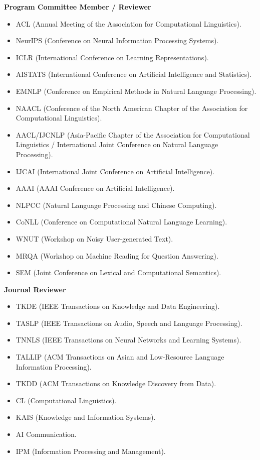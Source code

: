 \noindent \textbf{Program Committee Member / Reviewer}
\begin{itemize}[label={},leftmargin=15pt]
\item ACL (Annual Meeting of the Association for Computational Linguistics).
\item NeurIPS (Conference on Neural Information Processing Systems).
\item ICLR (International Conference on Learning Representations).
\item AISTATS (International Conference on Artificial Intelligence and Statistics).
\item EMNLP (Conference on Empirical Methods in Natural Language Processing).
\item NAACL (Conference of the North American Chapter of the Association for Computational Linguistics).
\item AACL/IJCNLP (Asia-Pacific Chapter of the Association for Computational Linguistics / International Joint Conference on Natural Language Processing).
\item IJCAI (International Joint Conference on Artificial Intelligence).
\item AAAI (AAAI Conference on Artificial Intelligence).
\item NLPCC (Natural Language Processing and Chinese Computing).
\item CoNLL (Conference on Computational Natural Language Learning).
\item WNUT (Workshop on Noisy User-generated Text).
\item MRQA (Workshop on Machine Reading for Question Answering).
\item SEM (Joint Conference on Lexical and Computational Semantics).
\end{itemize}

\noindent \textbf{Journal Reviewer}
\begin{itemize}[label={},leftmargin=15pt]
\item TKDE (IEEE Transactions on Knowledge and Data Engineering).
\item TASLP (IEEE Transactions on Audio, Speech and Language Processing).
\item TNNLS (IEEE Transactions on Neural Networks and Learning Systems).
\item TALLIP (ACM Transactions on Asian and Low-Resource Language Information Processing).
\item TKDD (ACM Transactions on Knowledge Discovery from Data).
\item CL (Computational Linguistics).
\item KAIS (Knowledge and Information Systems).
\item AI Communication.
\item IPM (Information Processing and Management).
\end{itemize}

